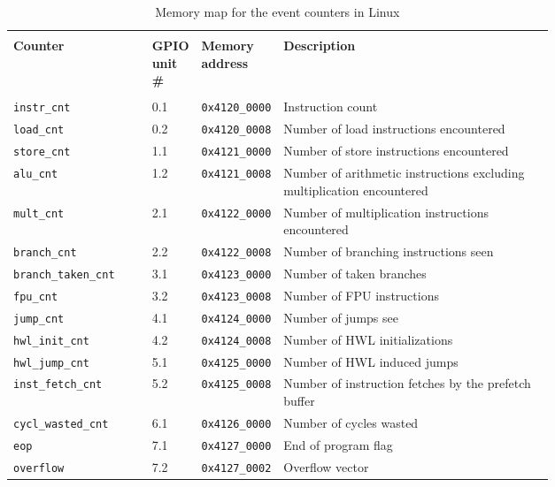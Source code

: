 \documentclass[../bachelor_paper.tex]{subfiles}
\begin{document}
\begin{table}
    \centering
    \begin{tabular}{lp{0.08\linewidth}p{0.13\linewidth}p{0.5\linewidth}}
        \hline \\[-0.9em]
        \textbf{Counter}    & \textbf{GPIO unit \#} & \textbf{Memory address}   & \textbf{Description}  \\
        \hline \\[-0.9em]
        \texttt{instr\_cnt} & 0.1                   & \texttt{0x4120\_0000}     & Instruction count     \\
        \texttt{load\_cnt}  & 0.2                   & \texttt{0x4120\_0008}     & Number of load instructions encountered \\
        \texttt{store\_cnt} & 1.1                   & \texttt{0x4121\_0000}     & Number of store instructions encountered \\
        \texttt{alu\_cnt}   & 1.2                   & \texttt{0x4121\_0008}     & Number of arithmetic instructions excluding multiplication encountered \\
        \texttt{mult\_cnt}  & 2.1                   & \texttt{0x4122\_0000}     & Number of multiplication instructions encountered \\
        \texttt{branch\_cnt}& 2.2                   & \texttt{0x4122\_0008}     & Number of branching instructions seen \\
        \texttt{branch\_taken\_cnt} & 3.1           & \texttt{0x4123\_0000}     & Number of taken branches \\
        \texttt{fpu\_cnt}   & 3.2                   & \texttt{0x4123\_0008}     & Number of \ac{FPU} instructions \\
        \texttt{jump\_cnt}  & 4.1                   & \texttt{0x4124\_0000}     & Number of jumps see \\
        \texttt{hwl\_init\_cnt} & 4.2               & \texttt{0x4124\_0008}     & Number of \ac{HWL} initializations \\
        \texttt{hwl\_jump\_cnt} & 5.1               & \texttt{0x4125\_0000}     & Number of \ac{HWL} induced jumps \\
        \texttt{inst\_fetch\_cnt} & 5.2             & \texttt{0x4125\_0008}     & Number of instruction fetches by the prefetch buffer \\
        \texttt{cycl\_wasted\_cnt} & 6.1            & \texttt{0x4126\_0000}     & Number of cycles wasted \\
        \texttt{eop}        & 7.1                   & \texttt{0x4127\_0000}     & End of program flag \\
        \texttt{overflow}   & 7.2                   & \texttt{0x4127\_0002}     & Overflow vector \\
        \hline
    \end{tabular}
    \caption{Memory map for the event counters in Linux}
    \label{tab:arch/enl/memmap}
\end{table}
\end{document}
